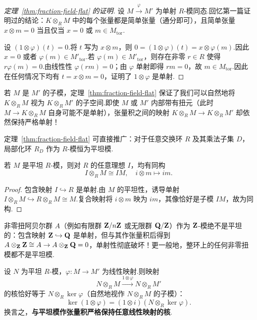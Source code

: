 \begin{proof}[定理~\ref{thm:fraction-field-flat} 的证明]
设 $M \xrightarrow{\varphi} M'$ 为单射 $R$-模同态.回忆第一篇证明过的结论：$K \otimes_R M$ 中的每个张量都是简单张量（通分即可），且简单张量 $x \otimes m = 0$ 当且仅当 $x = 0$ 或 $m \in M_{\mathrm{tor}}$.

设 $(1 \otimes \varphi)(t) = 0$.将 $t$ 写为 $x \otimes m$，则 $0 = (1 \otimes \varphi)(t) = x \otimes \varphi(m)$.因此 $x = 0$ 或者 $\varphi(m) \in M'_{\mathrm{tor}}$.若 $\varphi(m) \in M'_{\mathrm{tor}}$，则存在非零 $r \in R$ 使得 $r\varphi(m) = 0$.由线性性 $\varphi(rm) = 0$；由 $\varphi$ 单射即得 $rm = 0$，故 $m \in M_{\mathrm{tor}}$.因此在任何情况下均有 $t = x \otimes m = 0$，证明了 $1 \otimes \varphi$ 是单射.
\end{proof}

若 $M$ 是 $M'$ 的子模，定理~\ref{thm:fraction-field-flat} 保证了我们可以自然地将 $K \otimes_R M$ 视为 $K \otimes_R M'$ 的子空间.即使 $M$ 或 $M'$ 内部带有扭元（此时 $M \to K \otimes_R M$ 自身可能不是单射），张量积之间的映射 $K \otimes_R M \to K \otimes_R M'$ 却依然保持严格单射！

\begin{remark}\label{rem:localization-flat}
定理~\ref{thm:fraction-field-flat} 可直接推广：对于任意交换环 $R$ 及其乘法子集 $D$，局部化环 $R_D$ 作为 $R$-模恒为平坦模.
\end{remark}

\begin{theorem}\label{thm:flat-ideal-mult}
若 $M$ 是平坦 $R$-模，则对 $R$ 的任意理想 $I$，均有同构
\[
  I \otimes_R M \cong IM, \quad i \otimes m \mapsto im.
\]
\end{theorem}

\begin{proof}
包含映射 $I \hookrightarrow R$ 是单射.由 $M$ 的平坦性，诱导单射 $I \otimes_R M \hookrightarrow R \otimes_R M \cong M$.复合映射将 $i \otimes m$ 映为 $im$，其像恰好是子模 $IM$，故为同构.
\end{proof}

\begin{example}[非平坦模范例]\label{ex:non-flat-torsion}
非零扭阿贝尔群 $A$（例如有限群 $\mathbf{Z}/n\mathbf{Z}$ 或无限群 $\mathbf{Q}/\mathbf{Z}$）作为 $\mathbf{Z}$-模绝不是平坦的：包含映射 $\mathbf{Z} \hookrightarrow \mathbf{Q}$ 是单射，但与其作张量积后得到 $A \otimes_{\mathbf{Z}} \mathbf{Z} \cong A \to A \otimes_{\mathbf{Z}} \mathbf{Q} = 0$，单射性彻底破坏！更一般地，整环上的任何非零扭模都不是平坦模.
\end{example}

\begin{theorem}[平坦模与核的精确保持]\label{thm:flat-preserves-kernel}
设 $N$ 为平坦 $R$-模，$\varphi \colon M \to M'$ 为线性映射.则映射
\[
  N \otimes_R M \xrightarrow{1 \otimes \varphi} N \otimes_R M'
\]
的核恰好等于 $N \otimes_R \ker \varphi$（自然地视作 $N \otimes_R M$ 的子模）：
\[
  \ker(1 \otimes \varphi) = (1 \otimes i)(N \otimes_R \ker \varphi).
\]
换言之，\textbf{与平坦模作张量积严格保持任意线性映射的核}.
\end{theorem}

